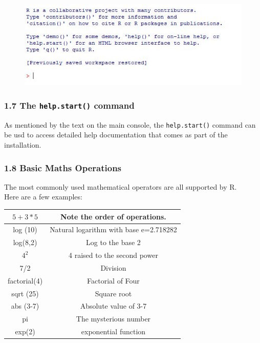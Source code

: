 \documentclass{beamer}
\begin{document}
 	\begin{frame}
 		\begin{figure}
 			\centering
 			\includegraphics[width=1.2\linewidth]{images/Rhelpcommands}
 		\end{figure}
 	\end{frame}   
 	
 	
 
 	\begin{frame}
 		
 		
 		\frametitle{1.7 The \texttt{help.start()} command}
 		As mentioned by the text on the main console, the \texttt{help.start()} command can be usd to
 		access detailed help documentation that comes as part of the installation.
 	\end{frame}
 	\begin{frame}
 		
 		\frametitle{1.8 Basic Maths Operations}
 		The most commonly used mathematical operators are all supported by R. \\Here are a few
 		examples:
 		\begin{tabular}{|c|c|}
 			$5 + 3 \ast 5$ &  Note the order of operations.\\\hline
 			log (10) & Natural logarithm with base e=2.718282 \\\hline
 			log(8,2) & Log to the base 2 \\\hline
 			$4^2$ & 4 raised to the second power \\\hline
 			7/2 & Division \\\hline
 			factorial(4) & Factorial of Four \\\hline
 			sqrt (25) & Square root \\\hline
 			abs (3-7) & Absolute value of 3-7 \\\hline
 			pi & The mysterious number \\\hline
 			exp(2) & exponential function \\\hline
 			
 		\end{tabular} 
 	\end{frame}
 	
\end{document}
